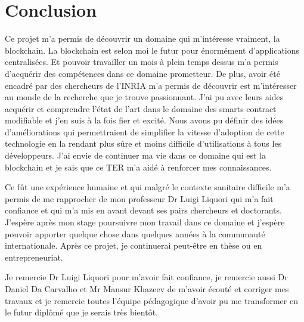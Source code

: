 \section{Conclusion}

Ce projet m'a permis de découvrir un domaine qui m'intéresse vraiment, la blockchain. La blockchain est selon moi
le futur pour énormément d'applications centralisées. Et pouvoir travailler un mois à plein temps dessus m'a permis 
d'acquérir des compétences dans ce domaine prometteur. De plus, avoir été encadré par des chercheurs de l'INRIA 
m'a permis de découvrir est m'intéresser au monde de la recherche que je trouve passionnant. J'ai pu avec leurs
aides acquérir et comprendre l'état de l'art dans le domaine des smarts contract modifiable et j'en suis à la fois
fier et excité. Nous avons pu définir des idées d'améliorations qui permettraient de simplifier la vitesse d'adoption
de cette technologie en la rendant plus sûre et moins difficile d'utilisations à tous les développeurs. J'ai
envie de continuer ma vie dans ce domaine qui est la blockchain et je sais que ce TER m'a aidé à renforcer mes
connaissances. 

Ce fût une expérience humaine et qui malgré le contexte sanitaire difficile m'a permis de me rapprocher de mon 
professeur Dr Luigi Liquori qui m'a fait confiance et qui m'a mis en avant devant ses pairs chercheurs et doctorants.
J'espère après mon stage poursuivre mon travail dans ce domaine et j'espère pouvoir apporter quelque chose dans quelques
années à la communauté internationale. Après ce projet, je continuerai peut-être en thèse ou en entrepreneuriat. 

Je remercie Dr Luigi Liquori pour m'avoir fait confiance, je remercie aussi Dr Daniel Da Carvalho et Mr Mansur Khazeev
de m'avoir écouté et corriger mes travaux et je remercie toutes l'équipe pédagogique d'avoir pu me transformer en le 
futur diplômé que je serais très bientôt. 
